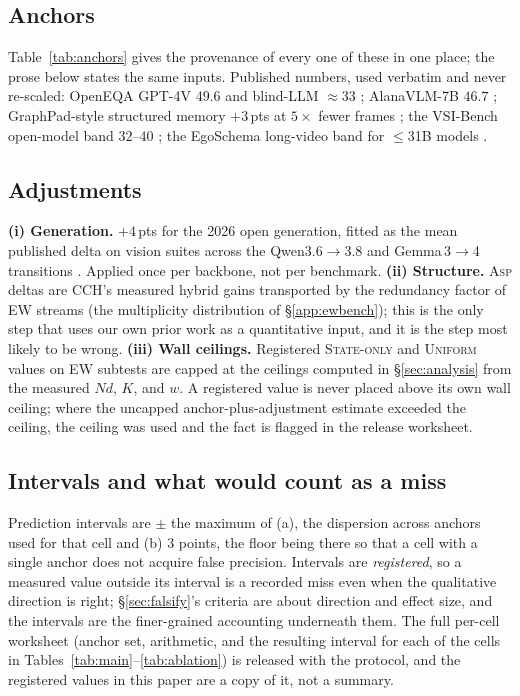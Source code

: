 \documentclass[10pt]{article}
\theoremstyle{definition}
\theoremstyle{plain}
\newcommand{\ASP}{\textsc{Asp}}
\begin{document}
\subsection{Anchors}
Table~\ref{tab:anchors} gives the provenance of every one of these in one place; the prose
below states the same inputs. Published numbers, used verbatim and never re-scaled: OpenEQA GPT-4V $49.6$ and blind-LLM $\approx33$ \citep{openeqa}; AlanaVLM-7B $46.7$ \citep{alanavlm}; GraphPad-style structured memory $+3$\,pts at $5\times$ fewer frames \citep{graphpad}; the VSI-Bench open-model band $32$--$40$ \citep{vsibench}; the EgoSchema long-video band for $\le$31B models \citep{egoschema,videoagent}.

\subsection{Adjustments}
\textbf{(i) Generation.} $+4$\,pts for the 2026 open generation, fitted as the mean published delta on vision suites across the Qwen3.6$\to$3.8 and Gemma\,3$\to$4 transitions \citep{qwen38,gemma4}. Applied once per backbone, not per benchmark.
\textbf{(ii) Structure.} \ASP{} deltas are CCH's measured hybrid gains transported by the redundancy factor of EW streams (the multiplicity distribution of \S\ref{app:ewbench}); this is the only step that uses our own prior work as a quantitative input, and it is the step most likely to be wrong.
\textbf{(iii) Wall ceilings.} Registered \textsc{State-only} and \textsc{Uniform} values on EW subtests are capped at the ceilings computed in \S\ref{sec:analysis} from the measured $Nd$, $K$, and $w$. A registered value is never placed above its own wall ceiling; where the uncapped anchor-plus-adjustment estimate exceeded the ceiling, the ceiling was used and the fact is flagged in the release worksheet.

\subsection{Intervals and what would count as a miss}
Prediction intervals are $\pm$ the maximum of (a), the dispersion across anchors used for that cell and (b) $3$ points, the floor being there so that a cell with a single anchor does not acquire false precision. Intervals are \emph{registered}, so a measured value outside its interval is a recorded miss even when the qualitative direction is right; \S\ref{sec:falsify}'s criteria are about direction and effect size, and the intervals are the finer-grained accounting underneath them. The full per-cell worksheet (anchor set, arithmetic, and the resulting interval for each of the cells in Tables~\ref{tab:main}--\ref{tab:ablation}) is released with the protocol, and the registered values in this paper are a copy of it, not a summary.
\end{document}
